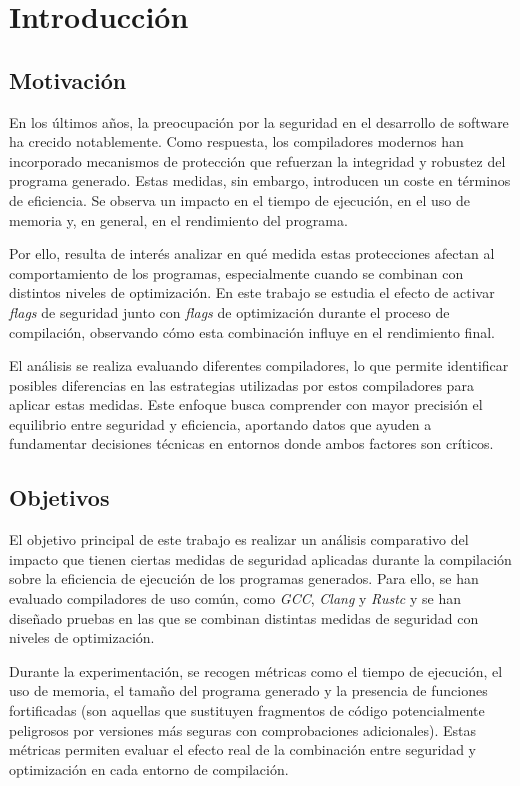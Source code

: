 \chapter{Introducción}

\section{Motivación}

En los últimos años, la preocupación por la seguridad en el desarrollo
de software ha crecido notablemente. Como respuesta, los compiladores
modernos han incorporado mecanismos de protección que refuerzan la
integridad y robustez del programa generado.
Estas medidas, sin embargo, introducen un coste en términos de
eficiencia. Se observa un impacto en el tiempo de ejecución, en el uso
de memoria y, en general, en el rendimiento del programa.

Por ello, resulta de interés analizar en qué medida estas protecciones
afectan al comportamiento de los programas, especialmente cuando se
combinan con distintos niveles de optimización. En este trabajo se
estudia el efecto de activar \emph{flags} de seguridad junto con
\emph{flags} de optimización durante el proceso de compilación,
observando cómo esta combinación influye en el rendimiento final.

El análisis se realiza evaluando diferentes compiladores, lo que permite
identificar posibles diferencias en las estrategias utilizadas por estos 
compiladores para aplicar estas medidas. Este enfoque busca comprender 
con mayor precisión el equilibrio entre seguridad y eficiencia, aportando 
datos que ayuden a fundamentar decisiones técnicas en entornos donde ambos
factores son críticos.

\section{Objetivos}

El objetivo principal de este trabajo es realizar un análisis
comparativo del impacto que tienen ciertas medidas de seguridad
aplicadas durante la compilación sobre la eficiencia de ejecución de los
programas generados.
Para ello, se han evaluado compiladores de uso común, como \emph{GCC},
\emph{Clang} y \emph{Rustc} y se han diseñado pruebas en las que se
combinan distintas medidas de seguridad con niveles de optimización.

Durante la experimentación, se recogen métricas como el tiempo de
ejecución, el uso de memoria, el tamaño del programa generado y la
presencia de funciones fortificadas (son aquellas que sustituyen
fragmentos de código potencialmente peligrosos por versiones más seguras
con comprobaciones adicionales). Estas métricas permiten evaluar el
efecto real de la combinación entre seguridad y optimización en cada
entorno de compilación.

